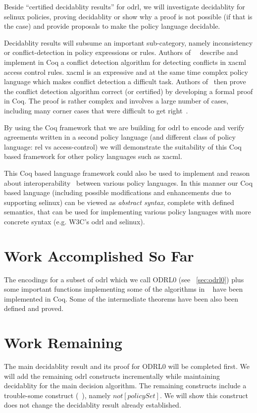Beside ``certified decidablity results'' for \ac{odrl}, we will investigate decidablity for \ac{selinux} policies, proving decidablity or show why a proof is not possible (if that is the case) and provide proposals to make the policy language decidable.

Decidablity results will subsume an important sub-category, namely inconsistency or conflict-detection in policy expressions or rules. Authors of~\cite{st2012verified}~\cite{felty13} describe and implement in Coq a conflict detection algorithm for detecting conflicts in \ac{xacml} access control rules. \ac{xacml} is an expressive and at the same time complex policy language which makes conflict detection a difficult task. Authors of~\cite{st2012verified} then prove the conflict detection algorithm correct (or certified) by developing a formal proof in Coq. The proof is rather complex and involves a large number of cases, including many
corner cases that were difficult to get right~\cite{st2012verified}. 

By using the Coq framework that we are building for \ac{odrl} to encode and verify agreements written in a second policy language (and different class of policy language: \ac{rel} vs access-control) we will demonstrate the suitability of this Coq based framework for other policy languages such as \ac{xacml}. 

This Coq based language framework could also be used to implement and reason about interoperability~\cite{prados2005interoperability, maronas2009architecture} between various policy languages. In this manner our Coq based language (including possible modifications and enhancements due to supporting \ac{selinux}) can be viewed as \emph{abstract syntax}, complete with defined semantics, that can be used for implementing various policy languages with more concrete syntax (e.g. W3C's \ac{odrl} and \ac{selinux}). 

\section{Work Accomplished So Far}

The encodings for a subset of \ac{odrl} which we call ODRL0 (see ~\ref{sec:odrl0}) plus some important functions implementing some of the algorithms in ~\cite{pucella2006} have been implemented in Coq. Some of the intermediate theorems have been also been defined and proved.

\section{Work Remaining}
The main decidablity result and its proof for ODRL0 will be completed first. We will add the remaining \ac{odrl} constructs incrementally while maintaining decidablity for the main decision algorithm. The remaining constructs include a trouble-some construct (~\cite{pucella2006}), namely $not[policySet]$. We will show this construct does not change the decidablity result already established. 

